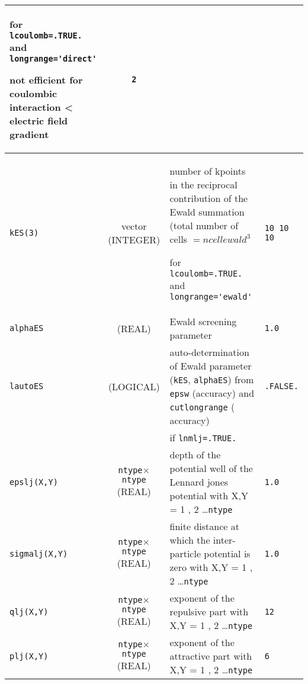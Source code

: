 \documentclass[a4paper]{article}
\begin{document}
\begin{longtable}{l|c|m{8cm}|m{2cm}}
                                          for \verb?lcoulomb=.TRUE.? and \verb?longrange='direct'?  \newline                  
					  
					  not efficient for coulombic interaction < electric field gradient                  & \verb?2? \\
\hline
\rule[-0.75cm]{0cm}{1.5cm}
\verb?kES(3)?  &  vector (INTEGER)     & \newline number of kpoints in the reciprocal contribution of the Ewald summation
                                         (total number of cells $=ncellewald^3$ \newline                                      
					 
					 for \verb?lcoulomb=.TRUE.? and \verb?longrange='ewald'?  \newline                    & \verb?10 10 10? \\
\hline
\rule[-0.75cm]{0cm}{1.5cm}
\verb?alphaES?     &  (REAL)            & Ewald screening parameter                                                           & \verb?1.0? \\
\hline
\rule[-0.75cm]{0cm}{1.5cm}
\verb?lautoES?     &  (LOGICAL)         & auto-determination of Ewald parameter (\verb?kES?, \verb?alphaES?) from \verb?epsw? (accuracy) and \verb?cutlongrange? ( accuracy)  & \verb?.FALSE.? \\
\hline
\hline
\rule[-0.75cm]{0cm}{1.5cm}
 &  & if \verb?lnmlj=.TRUE.? & \\
\hline
\rule[-0.75cm]{0cm}{1.5cm}
\verb?epslj(X,Y)?       &  \verb?ntype?$\times$\verb?ntype? (REAL)  & depth of the potential well of the Lennard jones potential with X,Y = 1 , 2 \ldots \verb?ntype?   & \verb?1.0? \tabularnewline
\hline
\rule[-0.75cm]{0cm}{1.5cm}
\verb?sigmalj(X,Y)?     & \verb?ntype?$\times$\verb?ntype?  (REAL)         & finite distance at which the inter-particle potential is zero with 
                                          X,Y = 1 , 2 \ldots \verb?ntype?                                                     & \verb?1.0? \\
\hline
\rule[-0.75cm]{0cm}{1.5cm}
\verb?qlj(X,Y)?    & \verb?ntype?$\times$\verb?ntype? (REAL)            & exponent of the repulsive part with X,Y = 1 , 2 \ldots \verb?ntype?                 & \verb?12? \\
\hline
\rule[-0.75cm]{0cm}{1.5cm}
\verb?plj(X,Y)?    & \verb?ntype?$\times$\verb?ntype? (REAL)            & exponent of the attractive part with X,Y = 1 , 2 \ldots \verb?ntype?                & \verb?6? \\

\end{longtable}
\end{document}
